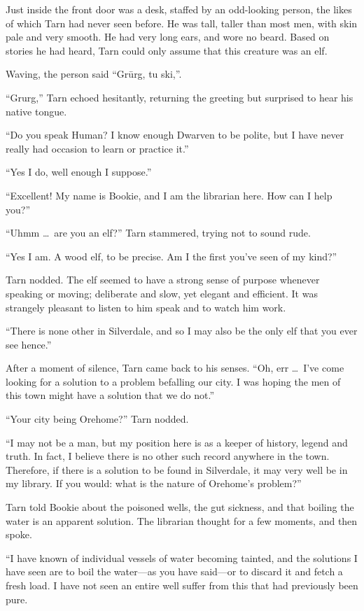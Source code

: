Just inside the front door was a desk, staffed by an odd-looking person, the likes of which Tarn had never seen before.  He was tall, taller than most men, with skin pale and very smooth.  He had very long ears, and wore no beard.  Based on stories he had heard, Tarn could only assume that this creature was an elf.

Waving, the person said ``Gr\=urg, tu ski,''.

``Grurg,'' Tarn echoed hesitantly, returning the greeting but surprised to hear his native tongue.

``Do you speak Human?  I know enough Dwarven to be polite, but I have never really had occasion to learn or practice it.''

``Yes I do, well enough I suppose.''

``Excellent!  My name is Bookie, and I am the librarian here.  How can I help you?''

``Uhmm \ldots\ are you an elf?'' Tarn stammered, trying not to sound rude.

``Yes I am.  A wood elf, to be precise.  Am I the first you've seen of my kind?''

Tarn nodded.  The elf seemed to have a strong sense of purpose whenever speaking or moving; deliberate and slow, yet elegant and efficient.  It was strangely pleasant to listen to him speak and to watch him work.

``There is none other in Silverdale, and so I may also be the only elf that you ever see hence.''

After a moment of silence, Tarn came back to his senses.  ``Oh, err \ldots\ I've come looking for a solution to a problem befalling our city.  I was hoping the men of this town might have a solution that we do not.''

``Your city being Orehome?''  Tarn nodded.

``I may not be a man, but my position here is as a keeper of history, legend and truth.  In fact, I believe there is no other such record anywhere in the town.  Therefore, if there is a solution to be found in Silverdale, it may very well be in my library. If you would: what is the nature of Orehome's problem?''

Tarn told Bookie about the poisoned wells, the gut sickness, and that boiling the water is an apparent solution.  The librarian thought for a few moments, and then spoke.

``I have known of individual vessels of water becoming tainted, and the solutions I have seen are to boil the water---as you have said---or to discard it and fetch a fresh load.  I have not seen an entire well suffer from this that had previously been pure.

